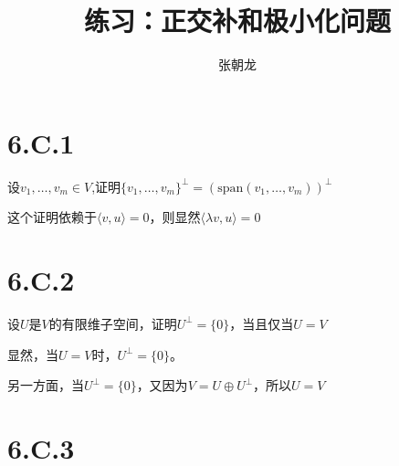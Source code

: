 \documentclass[10pt,a4paper,UTF8]{article}
\author{张朝龙}
\date{}
\title{练习：正交补和极小化问题}
\begin{document}
\maketitle
\tableofcontents
{}

\section{6.C.1}
\label{sec:org77828fb}


\begin{tikzproblem}
设\(v_{1},\ldots ,v_{m}\in V\),证明\(\{v_{1},\ldots ,v_{m}\}^{\bot}=  (\mathrm{span}(v_{1},\ldots ,v_{m}))^{\bot}\)
\end{tikzproblem}

\begin{tikzproof}
这个证明依赖于\(\langle v,u \rangle  =0\)，则显然\(\langle \lambda v,u \rangle  = 0\)
\end{tikzproof}

\section{6.C.2}
\label{sec:orgff48754}


\begin{tikzproblem}
设\(U\)是\(V\)的有限维子空间，证明\(U^{\bot} = \{0\}\)，当且仅当\(U=V\)
\end{tikzproblem}
\begin{tikzanswer}
显然，当\(U=V\)时，\(U^{\bot} = \{0\}\)。

另一方面，当\(U^{\bot} = \{0\}\)，又因为\(V = U\oplus U^{\bot}\)，所以\(U=V\)
\end{tikzanswer}

\section{6.C.3}
\label{sec:orgd3b714a}
\end{document}

